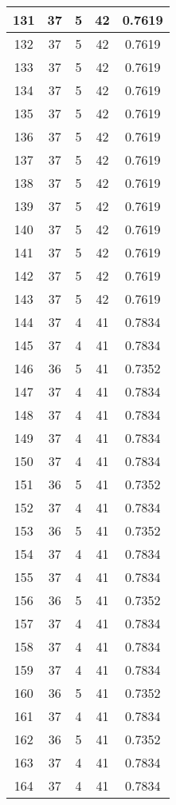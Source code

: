 \documentclass[letterpaper, 12pt]{article}
\begin{document}
\begin{longtable}{|c|c|c|c|c|}
\hline
131 & 37 & 5 & 42 & 0.7619 \\
\hline
132 & 37 & 5 & 42 & 0.7619 \\
\hline
133 & 37 & 5 & 42 & 0.7619 \\
\hline
134 & 37 & 5 & 42 & 0.7619 \\
\hline
135 & 37 & 5 & 42 & 0.7619 \\
\hline
136 & 37 & 5 & 42 & 0.7619 \\
\hline
137 & 37 & 5 & 42 & 0.7619 \\
\hline
138 & 37 & 5 & 42 & 0.7619 \\
\hline
139 & 37 & 5 & 42 & 0.7619 \\
\hline
140 & 37 & 5 & 42 & 0.7619 \\
\hline
141 & 37 & 5 & 42 & 0.7619 \\
\hline
142 & 37 & 5 & 42 & 0.7619 \\
\hline
143 & 37 & 5 & 42 & 0.7619 \\
\hline
144 & 37 & 4 & 41 & 0.7834 \\
\hline
145 & 37 & 4 & 41 & 0.7834 \\
\hline
146 & 36 & 5 & 41 & 0.7352 \\
\hline
147 & 37 & 4 & 41 & 0.7834 \\
\hline
148 & 37 & 4 & 41 & 0.7834 \\
\hline
149 & 37 & 4 & 41 & 0.7834 \\
\hline
150 & 37 & 4 & 41 & 0.7834 \\
\hline
151 & 36 & 5 & 41 & 0.7352 \\
\hline
152 & 37 & 4 & 41 & 0.7834 \\
\hline
153 & 36 & 5 & 41 & 0.7352 \\
\hline
154 & 37 & 4 & 41 & 0.7834 \\
\hline
155 & 37 & 4 & 41 & 0.7834 \\
\hline
156 & 36 & 5 & 41 & 0.7352 \\
\hline
157 & 37 & 4 & 41 & 0.7834 \\
\hline
158 & 37 & 4 & 41 & 0.7834 \\
\hline
159 & 37 & 4 & 41 & 0.7834 \\
\hline
160 & 36 & 5 & 41 & 0.7352 \\
\hline
161 & 37 & 4 & 41 & 0.7834 \\
\hline
162 & 36 & 5 & 41 & 0.7352 \\
\hline
163 & 37 & 4 & 41 & 0.7834 \\
\hline
164 & 37 & 4 & 41 & 0.7834 \\

\end{longtable}
\end{document}
